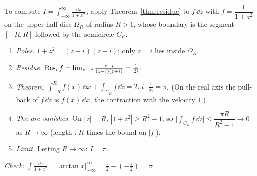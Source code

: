 \begin{example}\label{ex:realint}
To compute $I=\displaystyle\int_{-\infty}^\infty\frac{\dd x}{1+x^2}$, apply Theorem~\ref{thm:residue} to $f\,\dd z$ with $f=\dfrac1{1+z^2}$ on the upper half-disc $\Omega_R$ of radius $R>1$, whose boundary is the segment $[-R,R]$ followed by the semicircle $C_R$.
\begin{enumerate}
\item \emph{Poles.} $1+z^2=(z-i)(z+i)$; only $z=i$ lies inside $\Omega_R$.
\item \emph{Residue.} $\operatorname{Res}_if=\lim_{z\to i}\frac{z-i}{(z-i)(z+i)}=\frac1{2i}$.
\item \emph{Theorem.} $\int_{-R}^Rf(x)\,\dd x+\int_{C_R}f\,\dd z=2\pi i\cdot\frac1{2i}=\pi$. (On the real axis the pull-back of $f\,\dd z$ is $f(x)\,\dd x$, the contraction with the velocity $1$.)
\item \emph{The arc vanishes.} On $|z|=R$, $|1+z^2|\ge R^2-1$, so $\bigl|\int_{C_R}f\,\dd z\bigr|\le\dfrac{\pi R}{R^2-1}\to0$ as $R\to\infty$ (length $\pi R$ times the bound on $|f|$).
\item \emph{Limit.} Letting $R\to\infty$: $I=\pi$.
\end{enumerate}
\emph{Check:} $\int\frac{\dd x}{1+x^2}=\arctan x\big|_{-\infty}^\infty=\frac\pi2-(-\frac\pi2)=\pi$ \checkmark.
\end{example}

